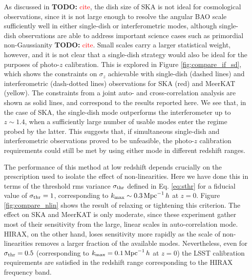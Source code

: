 \documentclass[prd,twocolumn]{revtex4}
\newcommand{\TODO}[1]{{\bf TODO:} \textcolor{red}{#1}}
\begin{document}
    As discussed in \TODO{cite}, the dish size of SKA is not ideal for cosmological observations,
    since it is not large enough to resolve the angular BAO scale sufficiently well in either
    single-dish or interferometric modes, although single-dish observations are able to address
    important science cases such as primordial non-Gaussianity \TODO{cite}. Small scales carry
    a larger statistical weight, however, and it is not clear that a single-dish strategy would
    also be ideal for the purposes of photo-$z$ calibration. This is explored in Figure
    \ref{fig:compare_if_sd}, which shows the constraints on $\sigma_z$ achievable with single-dish
    (dashed lines) and interferometric (dash-dotted lines) observations for SKA (red) and 
    MeerKAT (yellow). The constraints from a joint auto- and cross-correlation analysis are
    shown as solid lines, and correspond to the results reported here. We see that, in the case
    of SKA, the single-dish mode outperforms the interferometer up to $z\sim1.4$, when a
    sufficiently large number of usable modes enter the regime probed by the latter. This suggests
    that, if simultaneous single-dish and interferometric observations proved to be unfeasible,
    the photo-$z$ calibration requirements could still be met by using either mode in different
    redshift ranges.
    
    The performance of this method at low redshift depends crucially on the prescription used to
    isolate the effect of non-linearities. Here we have done this in terms of the threshold
    rms variance $\sigma_{\rm thr}$ defined in Eq. \ref{eq:sthr} for a fiducial value of
    $\sigma_{\rm thr}=1$, corresponding to $k_{\rm max}\sim0.3\,{\rm Mpc}^{-1}\,h$ at $z=0$.
    Figure \ref{fig:compare_nlin} shows the result of relaxing or tightening this criterion.
    The effect on SKA and MeerKAT is only moderate, since these experiment gather most of their
    sensitivity from the large, linear scales in auto-correlation mode. HIRAX, on the other hand,
    loses sensitivity more rapidly as the scale of non-linearities removes a larger fraction 
    of the available modes. Nevertheless, even for $\sigma_{\rm thr}=0.5$ (corresponding to
    $k_{\rm max}=0.1\,{\rm Mpc}^{-1}\,h$ at $z=0$) the LSST calibration requirements are satisfied
    in the redshift range corresponding to the HIRAX frequency band.
\end{document}
